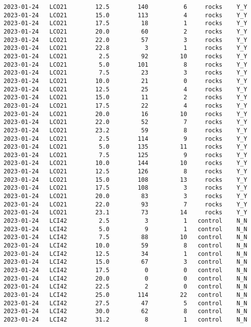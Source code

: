 \documentclass[
]{article}
\begin{document}
\begin{verbatim}
 2023-01-24   LCO21        12.5        140          6     rocks    Y_Y
 2023-01-24   LCO21        15.0        113          4     rocks    Y_Y
 2023-01-24   LCO21        17.5         18          1     rocks    Y_Y
 2023-01-24   LCO21        20.0         60          2     rocks    Y_Y
 2023-01-24   LCO21        22.0         57          3     rocks    Y_Y
 2023-01-24   LCO21        22.8          3          1     rocks    Y_Y
 2023-01-24   LCO21         2.5         92         10     rocks    Y_Y
 2023-01-24   LCO21         5.0        101          8     rocks    Y_Y
 2023-01-24   LCO21         7.5         23          3     rocks    Y_Y
 2023-01-24   LCO21        10.0         21          0     rocks    Y_Y
 2023-01-24   LCO21        12.5         25          4     rocks    Y_Y
 2023-01-24   LCO21        15.0         11          2     rocks    Y_Y
 2023-01-24   LCO21        17.5         22          4     rocks    Y_Y
 2023-01-24   LCO21        20.0         16         10     rocks    Y_Y
 2023-01-24   LCO21        22.0         52          7     rocks    Y_Y
 2023-01-24   LCO21        23.2         59          8     rocks    Y_Y
 2023-01-24   LCO21         2.5        114          9     rocks    Y_Y
 2023-01-24   LCO21         5.0        135         11     rocks    Y_Y
 2023-01-24   LCO21         7.5        125          9     rocks    Y_Y
 2023-01-24   LCO21        10.0        144         10     rocks    Y_Y
 2023-01-24   LCO21        12.5        126          8     rocks    Y_Y
 2023-01-24   LCO21        15.0        108         13     rocks    Y_Y
 2023-01-24   LCO21        17.5        108          3     rocks    Y_Y
 2023-01-24   LCO21        20.0         83          3     rocks    Y_Y
 2023-01-24   LCO21        22.0         93          7     rocks    Y_Y
 2023-01-24   LCO21        23.1         73         14     rocks    Y_Y
 2023-01-24   LCI42         2.5          3          1   control    N_N
 2023-01-24   LCI42         5.0          9          1   control    N_N
 2023-01-24   LCI42         7.5         88         10   control    N_N
 2023-01-24   LCI42        10.0         59          8   control    N_N
 2023-01-24   LCI42        12.5         34          1   control    N_N
 2023-01-24   LCI42        15.0         67          3   control    N_N
 2023-01-24   LCI42        17.5          0          0   control    N_N
 2023-01-24   LCI42        20.0          0          0   control    N_N
 2023-01-24   LCI42        22.5          2          0   control    N_N
 2023-01-24   LCI42        25.0        114         22   control    N_N
 2023-01-24   LCI42        27.5         47          5   control    N_N
 2023-01-24   LCI42        30.0         62          8   control    N_N
 2023-01-24   LCI42        31.2          8          1   control    N_N
\end{verbatim}
\end{document}
